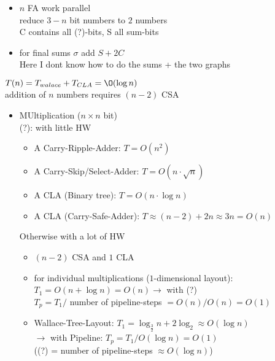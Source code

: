 \begin{itemize}
    \item $n$ FA work parallel \\
    reduce $3-n$ bit numbers to $2$ numbers \\
    C contains all (?)-bits, S all sum-bits
    \item for final sums $\sigma$ add $S+2C$ \\
    Here I dont know how to do the sums + the two graphs
\end{itemize} \smallskip

$T(n)=T_{walace}+T_{CLA}=\O(\log n)$ \\
addition of $n$ numbers requires $(n-2)$ CSA

\begin{itemize}
    \item MUltiplication ($n\times n$ bit) \\
    (?): with little HW
    \begin{itemize}
        \item A Carry-Ripple-Adder: $T=O(n^2)$
        \item A Carry-Skip/Select-Adder: $T=O(n\cdot \sqrt{n})$
        \item A CLA (Binary tree): $T=O(n\cdot \log n)$
        \item A CLA (Carry-Safe-Adder): $T\approx (n-2)+2n\approx 3n=O(n)$
    \end{itemize}
    Otherwise with a lot of HW \\
    \begin{itemize}
        \item $(n-2)$ CSA and $1$ CLA
        \item for individual multiplications ($1$-dimensional layout): $T_1=O(n+\log n)=O(n) \rightarrow$ with (?) \\
        $T_p=T_1/$ number of pipeline-steps $=O(n)/O(n)=O(1)$
        \item Wallace-Tree-Layout: $T_1=\log_{\frac{3}{2}} n+2\log_2 \approx O(\log n)$ \\
        $\rightarrow $ with Pipeline: $T_p=T_1/O(\log n)=O(1)$ \\
        ((?) = number of pipeline-steps $\approx O(\log n)$)
    \end{itemize}
   

\end{itemize}

